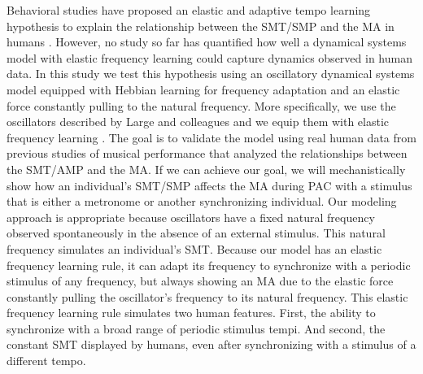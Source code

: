\documentclass{report}
\begin{document}
Behavioral studies have proposed an elastic and adaptive tempo learning hypothesis to explain the relationship between the SMT/SMP and the MA in humans \cite{scheurich2018tapping}. However, no study so far has quantified how well a dynamical systems model with elastic frequency learning could capture dynamics observed in human data. In this study we test this hypothesis using an oscillatory dynamical systems model equipped with Hebbian learning for frequency adaptation and an elastic force constantly pulling to the natural frequency. More specifically, we use the oscillators described by Large and colleagues \cite{large2010canonical} and we equip them with elastic frequency learning \cite{righetti2009adaptive, lambert2016adaptive}. The goal is to validate the model using real human data from previous studies of musical performance that analyzed the relationships between the SMT/AMP and the MA. If we can achieve our goal, we will mechanistically show how an individual's SMT/SMP affects the MA during PAC with a stimulus that is either a metronome or another synchronizing individual. Our modeling approach is appropriate because oscillators have a fixed natural frequency observed spontaneously in the absence of an external stimulus. This natural frequency simulates an individual's SMT. Because our model has an elastic frequency learning rule, it can adapt its frequency to synchronize with a periodic stimulus of any frequency, but always showing an MA due to the elastic force constantly pulling the oscillator's frequency to its natural frequency. This elastic frequency learning rule simulates two human features. First, the ability to synchronize with a broad range of periodic stimulus tempi. And second, the constant SMT displayed by humans, even after synchronizing with a stimulus of a different tempo. 
\end{document}
